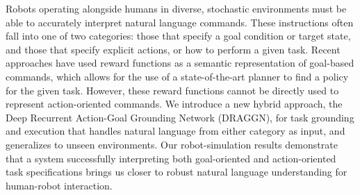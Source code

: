 Robots operating alongside humans in diverse, stochastic environments must be able to accurately interpret natural language commands. These instructions often fall into one of two categories: those that specify a goal condition or target state, and those that specify explicit actions, or how to perform a given task. Recent approaches have used reward functions as a semantic representation of goal-based commands, which allows for the use of a state-of-the-art planner to find a policy for the given task. However, these reward functions cannot be directly used to represent action-oriented commands. We introduce a new hybrid approach, the Deep Recurrent Action-Goal Grounding Network (DRAGGN), for task grounding and execution that handles natural language from either category as input, and generalizes to unseen environments. Our robot-simulation results demonstrate that a system successfully interpreting both goal-oriented and action-oriented task specifications brings us closer to robust natural language understanding for human-robot interaction.
